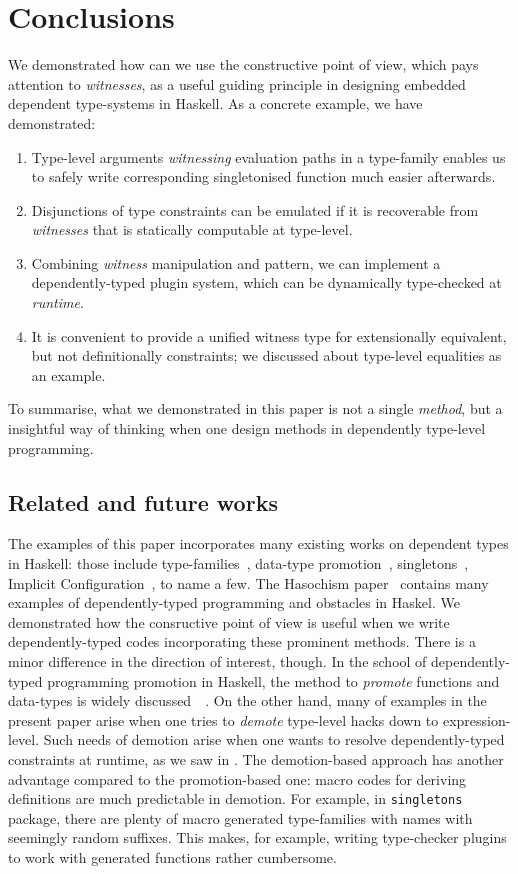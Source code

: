 \documentclass[demotion-paper.tex]{subfiles}
\begin{document}
\section{Conclusions}
\label{sec:concl}
We demonstrated how can we use the constructive point of view, which pays attention to \emph{witnesses}, as a useful guiding principle in designing embedded dependent type-systems in Haskell.
As a concrete example, we have demonstrated:
\begin{enumerate}
  \item Type-level arguments \emph{witnessing} evaluation paths in a type-family enables us to safely write corresponding singletonised function much easier afterwards.
  \item Disjunctions of type constraints can be emulated if it is recoverable from \emph{witnesses} that is statically computable at type-level.
  \item Combining \emph{witness} manipulation and  pattern, we can implement a dependently-typed plugin system, which can be dynamically type-checked at \emph{runtime}.
  \item It is convenient to provide a unified witness type for extensionally equivalent, but not definitionally constraints; we discussed about type-level equalities as an example.
\end{enumerate}
To summarise, what we demonstrated in this paper is not a single \emph{method}, but a insightful way of thinking when one design methods in dependently type-level programming.

\subsection{Related and future works}
The examples of this paper incorporates many existing works on dependent types in Haskell: those include type-families~\cite{Kiselyov:2010aa}, data-type promotion~\cite{Yorgey:2012}, singletons~\cite{Eisenberg:2012}, Implicit Configuration~\cite{Kiselyov:2004aa}, to name a few.
The Hasochism paper~\cite{10.1145/2503778.2503786} contains many examples of dependently-typed programming and obstacles in Haskel.
We demonstrated how the consructive point of view is useful when we write dependently-typed codes incorporating these prominent methods.
There is a minor difference in the direction of interest, though.
In the school of dependently-typed programming promotion in Haskell, the method to \emph{promote} functions and data-types is widely discussed~~\cite{Yorgey:2012,Eisenberg:2012,10.1145/2503778.2503786}.
On the other hand, many of examples in the present paper arise when one tries to \emph{demote} type-level hacks down to expression-level.
Such needs of demotion arise when one wants to resolve dependently-typed constraints at runtime, as we saw in .
The demotion-based approach has another advantage compared to the promotion-based one: macro codes for deriving definitions are much predictable in demotion.
For example, in \texttt{singletons}~\cite{singletons} package, there are plenty of macro generated type-families with names with seemingly random suffixes.
This makes, for example, writing type-checker plugins to work with generated functions rather cumbersome.
\end{document}
